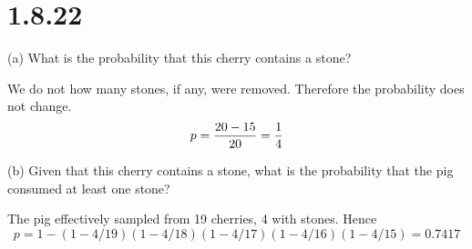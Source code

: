 \section*{1.8.22}
(a) What is the probability that this cherry contains a stone?

\bigskip
\noindent
We do not how many stones, if any, were removed.
Therefore the probability does not change.
$$p={20-15\over20}={1\over4}$$

\bigskip
\noindent
(b) Given that this cherry contains a stone, what is the probability
that the pig consumed at least one stone?

\bigskip
\noindent
The pig effectively sampled from 19 cherries, 4 with stones. Hence
$$p=1-(1-4/19)(1-4/18)(1-4/17)(1-4/16)(1-4/15)=0.7417$$

